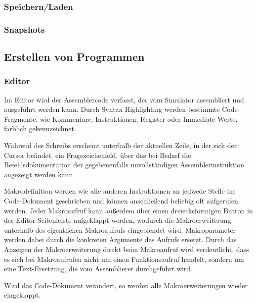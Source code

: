 \subsubsection{Speichern/Laden}

\subsubsection{Snapshots}


\subsection{Erstellen von Programmen}

\subsubsection{Editor}

Im Editor wird der Assemblercode verfasst, der vom Simulator assembliert und ausgeführt werden kann.
Durch Syntax Highlighting werden bestimmte Code-Fragmente, wie Kommentare, Instruktionen,
Register oder Immediate-Werte, farblich gekennzeichnet.

Während des Schreibs erscheint unterhalb der aktuellen Zeile, in der sich der Cursor
befindet, ein Fragezeichenfeld, über das bei Bedarf die Befehlsdokumentation der
gegebenenfalls unvollständigen Assemblerinstruktion angezeigt werden kann.

Makrodefinition werden wie alle anderen Instruktionen an jedwede Stelle ins Code-Dokument geschrieben und können anschließend beliebig oft aufgerufen werden. Jeder Makroaufruf kann außerdem über einen dreiecksförmigen Button in der Editor-Seitenleiste aufgeklappt werden, wodurch die Makroerweiterung unterhalb des eigentlichen Makroaufrufs eingeblendet wird. Makroparameter werden dabei durch die konkreten Argumente des Aufrufs ersetzt. Durch das Anzeigen der Makroerweiterung direkt beim Makroaufruf wird verdeutlicht, dass es sich bei Makroaufrufen nicht um einen Funktionsaufruf handelt, sondern um eine Text-Ersetzung, die vom Assemblierer durchgeführt wird.

Wird das Code-Dokument verändert, so werden alle Makroerweiterungen wieder eingeklappt.


